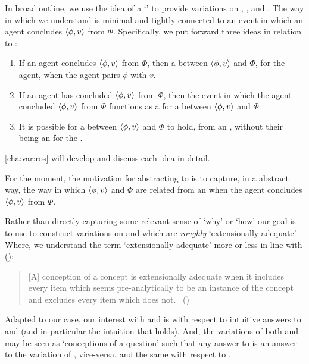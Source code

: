\begin{note}
  In broad outline, we use the idea of a `' to provide variations on \qWhy{}, \qHow{}, and \issueInclusion{}.
  The way in which we understand  is minimal and tightly connected to an event in which an agent concludes \(\langle \phi, v \rangle\) from \(\Phi\).
  Specifically, we put forward three ideas in relation to :
  \begin{enumerate}
  \item
    If an agent concludes \(\langle \phi, v \rangle\) from \(\Phi\), then a  between \(\langle \phi, v \rangle\) and \(\Phi\), for the agent, when the agent pairs \(\phi\) with \(v\).
  \item
    If an agent has concluded \(\langle \phi, v \rangle\) from \(\Phi\), then the event in which the agent concluded \(\langle \phi, v \rangle\) from \(\Phi\) functions as a  for a  between \(\langle \phi, v \rangle\) and \(\Phi\).
  \item
    It is possible for a  between \(\langle \phi, v \rangle\) and \(\Phi\) to hold, from an \agpe{}, without their being an  for the .
  \end{enumerate}

  \autoref{cha:var:ros} will develop and discuss each idea in detail.

  For the moment, the motivation for abstracting to  is to capture, in a abstract way, the way in which \(\langle \phi, v \rangle\) and \(\Phi\) are related from an \agpe{} when the agent concludes \(\langle \phi, v \rangle\) from \(\Phi\).

  Rather than directly capturing some relevant sense of `why' or `how' our goal is to use  to construct variations on \qWhy{} and \qHow{} which are \emph{roughly} `extensionally adequate'.
  Where, we understand the term `extensionally adequate' more-or-less in line with \citeauthor{Sumner:1987aa} (\citeyear{Sumner:1987aa}):

  \begin{quote}
    [A] conception of a concept is extensionally adequate when it includes every item which seems pre-analytically to be an instance of the concept and excludes every item which does not.%
    \mbox{ }\hfill\mbox{(\citeyear[49]{Sumner:1987aa})}
  \end{quote}

  Adapted to our case, our interest with \qWhy{} and \qHow{} is with respect to intuitive answers to \qWhy{} and \qHow{} (and in particular the intuition that \issueInclusion{} holds).
  And, the variations of both \qWhy{} and \qHow{} may be seen as `conceptions of a question' such that any answer to \qWhy{} is an answer to the variation of \qWhy{}, vice-versa, and the same with respect to \qHow{}.


\end{note}

